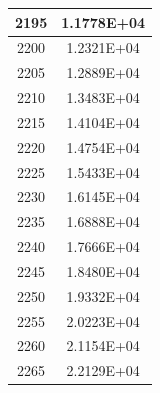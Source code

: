 \documentclass[a4paper]{article}
\begin{document}
\begin{tabular}{|c|c|}
		2195 & 1.1778E+04 \\
		\hline
		2200 & 1.2321E+04 \\
		\hline
		2205 & 1.2889E+04 \\
		\hline
		2210 & 1.3483E+04 \\
		\hline
		2215 & 1.4104E+04 \\
		\hline
		2220 & 1.4754E+04 \\
		\hline
		2225 & 1.5433E+04 \\
		\hline
		2230 & 1.6145E+04 \\
		\hline
		2235 & 1.6888E+04 \\
		\hline
		2240 & 1.7666E+04 \\
		\hline
		2245 & 1.8480E+04 \\
		\hline
		2250 & 1.9332E+04 \\
		\hline
		2255 & 2.0223E+04 \\
		\hline
		2260 & 2.1154E+04 \\
		\hline
		2265 & 2.2129E+04 \\
		\hline
	\end{tabular}
	\hfill
\end{document}
